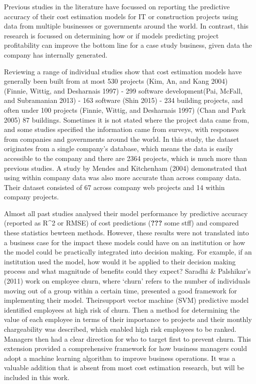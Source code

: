 \documentclass[]{elsarticle} %
\begin{document}
Previous studies in the literature have focussed on reporting the
predictive accuracy of their cost estimation models for IT or
construction projects using data from multiple businesses or governments
around the world. In contrast, this research is focussed on determining
how or if models predicting project profitability can improve the bottom
line for a case study business, given data the company has internally
generated.

Reviewing a range of individual studies show that cost estimation models
have generally been built from at most 530 projects (Kim, An, and Kang
2004) (Finnie, Wittig, and Desharnais 1997) - 299 software
development(Pai, McFall, and Subramanian 2013) - 163 software (Shin
2015) - 234 building projects, and often under 100 projects (Finnie,
Wittig, and Desharnais 1997) (Chan and Park 2005) 87 buildings.
Sometimes it is not stated where the project data came from, and some
studies specified the information came from surveys, with responses from
companies and governments around the world. In this study, the dataset
originates from a single company's database, which means the data is
easily accessible to the company and there are 2364 projects, which is
much more than previous studies. A study by Mendes and Kitchenham (2004)
demonstrated that using within company data was also more accurate than
across company data. Their dataset consisted of 67 across company web
projects and 14 within company projects.

Almost all past studies analysed their model performance by predictive
accuracy (reported as R\^{}2 or RMSE) of cost predictions
({\textbf{???}} some stff) and compared these statistics bewteen
methods. However, these results were not translated into a business case
for the impact these models could have on an institution or how the
model could be practically integrated into decision making. For example,
if an institution used the model, how would it be applied to their
decision making process and what magnitude of benefits could they
expect? Saradhi \& Palshikar's (2011) work on employee churn, where
`churn' refers to the number of individuals moving out of a group within
a certain time, presented a good framework for implementing their model.
Theirsupport vector machine (SVM) predictive model identified employees
at high risk of churn. Then a method for determining the value of each
employee in terms of their importance to projects and their monthly
chargeability was described, which enabled high risk employees to be
ranked. Managers then had a clear direction for who to target first to
prevent churn. This extension provided a comprehensive framework for how
business managers could adopt a machine learning algorithm to improve
business operations. It was a valuable addition that is absent from most
cost estimation research, but will be included in this work.
\end{document}
